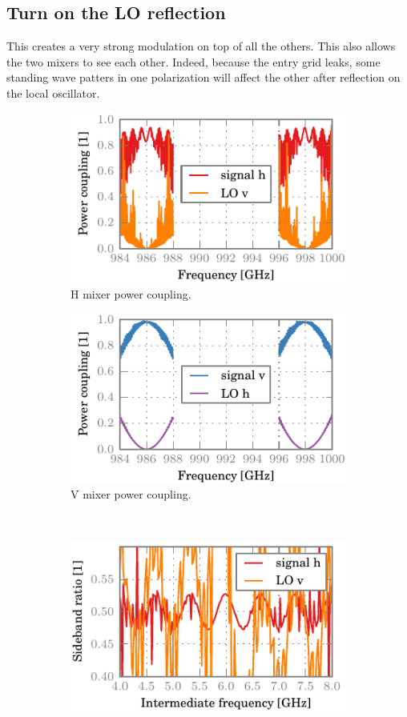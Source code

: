 \clearpage
\subsection{Turn on the LO reflection}
This creates a very strong modulation on top of all the others.
This also allows the two mixers to see each other.
Indeed, because the entry grid leaks, some standing wave patters in one polarization will affect the other after reflection on the local oscillator.

\begin{figure}[hbtp]
    \centering
    \begin{subfigure}[b]{.5\textwidth}
        \includegraphics{chapter_3/12_lor_att00_h_dsb}%
        \caption{H mixer power coupling.}
    \end{subfigure}%
    \begin{subfigure}[b]{.5\textwidth}
        \includegraphics{chapter_3/12_lor_att00_v_dsb}%
        \caption{V mixer power coupling.}
    \end{subfigure}%
    \\
    \begin{subfigure}[b]{.5\textwidth}
        \includegraphics{chapter_3/12_lor_att00_h_sbr}%

\end{subfigure}
\end{figure}
